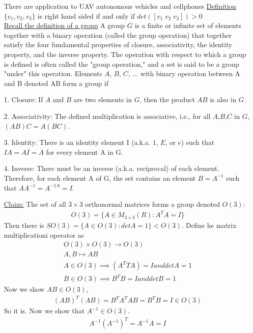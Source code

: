 \documentclass[12pt,letterpaper]{hmcpset}
\begin{document}
There are application to UAV autonomous vehicles and cellphones
\underline{Definition} $\{v_1, v_2, v_3\}$ is right hand sided if and only if
$det([v_1\; v_2\; v_3]) > 0$ \\
\underline{Recall the definition of a group} A group $G$ is a finite or infinite set of elements together with a binary
operation (called the group operation) that together satisfy the four
fundamental properties of closure, associativity, the identity property, and the
inverse property. The operation with respect to which a group is defined is
often called the "group operation," and a set is said to be a group "under" this
operation. Elements $A$, $B$, $C$, ... with binary operation between A and B denoted
AB form a group if

1. Closure: If $A$ and $B$ are two elements in $G$, then the product $AB$ is also in $G$.

2. Associativity: The defined multiplication is associative, i.e., for all $A$,$B$,$C$ in $G$, $(AB)C=A(BC)$.

3. Identity: There is an identity element I (a.k.a. $1$, $E$, or $e$) such that $IA=AI=A$ for every element A in G.

4. Inverse: There must be an inverse (a.k.a. reciprocal) of each element.
Therefore, for each element A of G, the set contains an element $B=A^{-1}$ such
that $AA^{-1}=A^{-1A}=I$.

\underline{Claim:} The set of all $3\times3$ orthonormal matrices forms a group
denoted $O(3)$:
\begin{align*}
  O(3) = \{ A \in M_{3\times 3}(R) : A^TA = I \}
\end{align*}
Then there is $SO(3) = \{ A \in O(3) : det A = 1 \} < O(3)$.
Define he matrix multiplicationi operator as
\begin{align*}
  O(3) \times O(3) \rightarrow O(3) \\
  A, B \mapsto AB \\
  A \in O(3) \implies (A^TTA) = I and det A = 1 \\
  B \in O(3) \implies B^TB = I and det B = 1
\end{align*}
Now we show $AB \in O(3)$,
\begin{align*}
  (AB)^T(AB) = B^TA^TAB = B^TB = I \in O(3)
\end{align*}
So it is.
Now we show that $A^{-1} \in O(3)$.
\begin{align*}
  A^{-1}(A^{-1})^T = A^{-1}A = I
\end{align*}
\end{document}
